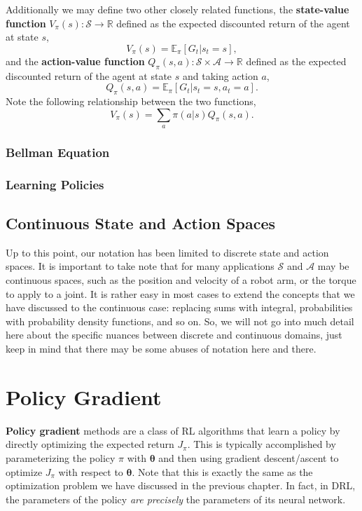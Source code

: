 \documentclass[12pt]{report}
\theoremstyle{definition}
\theoremstyle{remark}
\begin{document}
Additionally we may define two other closely related functions, the \textbf{state-value function} $V_\pi(s): \mathcal{S} \to \mathbb{R}$ defined as the expected discounted return of the agent at state $s$,
\begin{equation}
    V_\pi(s) = \mathbb{E}_\pi[G_t | s_t = s],
\end{equation}
and the \textbf{action-value function} $Q_\pi(s, a): \mathcal{S} \times \mathcal{A} \to \mathbb{R}$ defined as the expected discounted return of the agent at state $s$ and taking action $a$,
\begin{equation}
    Q_\pi(s, a) = \mathbb{E}_\pi[G_t | s_t = s, a_t = a].
\end{equation}
Note the following relationship between the two functions,
\begin{equation}
    V_\pi(s) = \sum_a \pi(a | s) Q_\pi(s, a).
\end{equation}

\subsubsection{Bellman Equation}

\subsubsection{Learning Policies}

\subsection{Continuous State and Action Spaces}
Up to this point, our notation has been limited to discrete state and action spaces. It is important to take note that for many applications $\mathcal{S}$ and $\mathcal{A}$ may be continuous spaces, such as the position and velocity of a robot arm, or the torque to apply to a joint. It is rather easy in most cases to extend the concepts that we have discussed to the continuous case: replacing sums with integral, probabilities with probability density functions, and so on. So, we will not go into much detail here about the specific nuances between discrete and continuous domains, just keep in mind that there may be some abuses of notation here and there.

\section{Policy Gradient}
\textbf{Policy gradient} methods are a class of RL algorithms that learn a policy by directly optimizing the expected return $J_\pi$. This is typically accomplished by parameterizing the policy $\pi$ with $\boldsymbol{\theta}$ and then using gradient descent/ascent to optimize $J_\pi$ with respect to $\boldsymbol{\theta}$. Note that this is exactly the same as the optimization problem we have discussed in the previous chapter. In fact, in DRL, the parameters of the policy \textit{are precisely} the parameters of its neural network.
\end{document}
